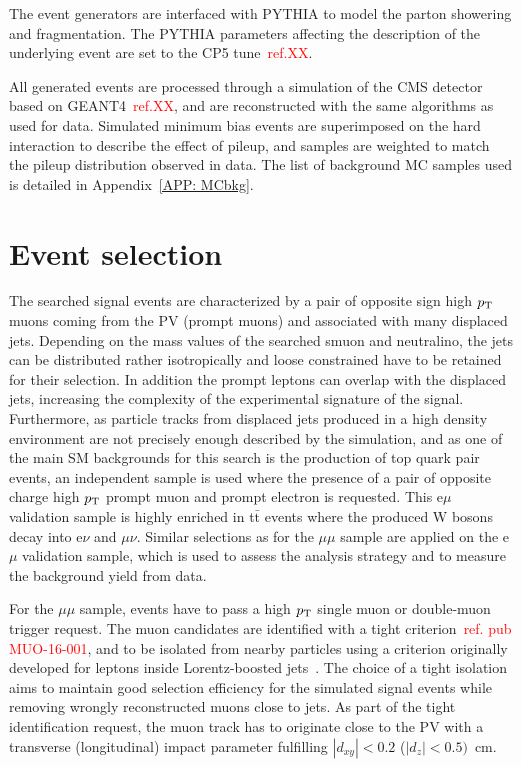 \documentclass{cernatlasnote}
\newcommand{\ttbar}{t$\bar{\text{t}}$\xspace}
\newcommand{\pt}{$p_{\text T}$\xspace}
\begin{document}
The event generators are interfaced with PYTHIA to model the parton showering and fragmentation. The PYTHIA parameters affecting the description of the underlying event are set to the CP5 tune~\textcolor{red}{ref.XX}.

All generated events are processed through a simulation of the CMS detector based on
GEANT4~\textcolor{red}{ref.XX}, and are reconstructed with the same algorithms as used for data. Simulated
minimum bias events are superimposed on the hard interaction to describe the effect of pileup,
and samples are weighted to match the pileup distribution observed in data. 
\newline \smallskip
The list of background MC samples used is detailed in Appendix~\ref{APP: MCbkg}. 

\section{Event selection}
\label{SEC: EVTSEL}

The searched signal events are characterized by a pair of opposite sign high \pt muons coming from the PV (prompt muons) and associated with many displaced jets. Depending on the mass values of the searched smuon and neutralino, the jets can be distributed rather isotropically and loose constrained have to be retained for their selection. In addition the prompt leptons can overlap with the displaced jets, increasing the complexity of the experimental signature of the signal. Furthermore, as particle tracks from displaced jets produced in a high density environment are not precisely enough described by the simulation, and as one of the main SM backgrounds for this search is the production of top quark pair events, an independent sample is used where the presence of a pair of opposite charge high \pt prompt muon and prompt electron is requested. This e$\mu$ validation sample is highly enriched in \ttbar events where the produced W bosons decay into e$\nu$ and $\mu\nu$. Similar selections as for the $\mu\mu$ sample are applied on the e$\mu$ validation sample, which is used to assess the analysis strategy and to measure the background yield from data. 

For the $\mu\mu$ sample, events have to pass a high \pt single muon or double-muon trigger request. 
The muon candidates are identified with a tight criterion~\textcolor{red}{ref. pub MUO-16-001}, and to be isolated from nearby particles using a criterion originally developed for leptons inside Lorentz-boosted jets~\cite{MiniIso1, MiniIso2}. The choice of a tight isolation aims to maintain good selection efficiency for the simulated signal events while removing wrongly reconstructed muons close to jets. 
As part of the tight identification request, the muon track has to originate close to the PV with a transverse (longitudinal) impact parameter fulfilling $|d_{xy}| < 0.2$ ($|d_z| < 0.5)$~cm.
\end{document}
